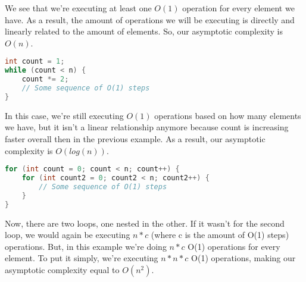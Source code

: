 \documentclass{article}
\begin{document}
We see that we're executing at least one $O(1)$ operation for every element we
have. As a result, the amount of operations we will be executing is directly
and linearly related to the amount of elements. So, our asymptotic complexity
is $O(n)$.

\begin{lstlisting}[language=Java]
int count = 1;
while (count < n) {
	count *= 2;
	// Some sequence of O(1) steps
}
\end{lstlisting}

In this case, we're still executing $O(1)$ operations based on how many
elements we have, but it isn't a linear relationship anymore because count is
increasing faster overall then in the previous example. As a result, our
asymptotic complexity is $O(log(n))$.

\begin{lstlisting}[language=Java]
for (int count = 0; count < n; count++) {
	for (int count2 = 0; count2 < n; count2++) {
		// Some sequence of O(1) steps
	}
}
\end{lstlisting}

Now, there are two loops, one nested in the other. If it wasn't for the second
loop, we would again be executing $n*c$ (where c is the amount of O(1) steps)
operations. But, in this example we're doing $n*c$ O(1) operations for every
element. To put it simply, we're executing $n*n*c$ O(1) operations, making our
asymptotic complexity equal to $O(n^2)$.
\end{document}
